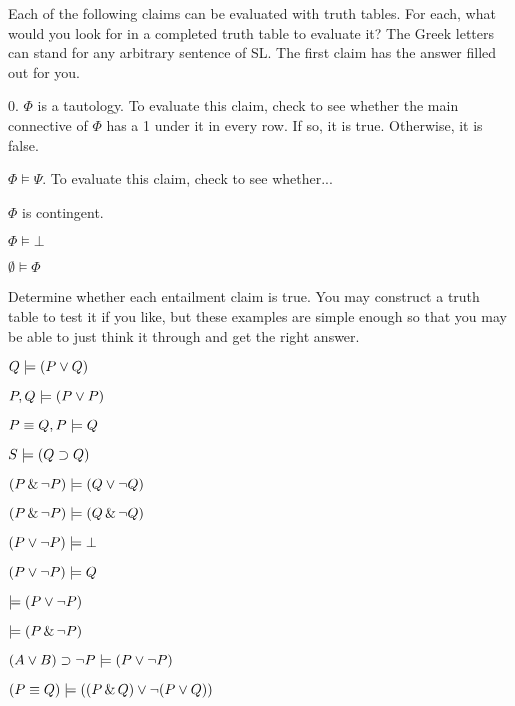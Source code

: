\practiceproblems


\solutions
\problempart
\label{pr.treesetup}
Each of the following claims can be evaluated with truth tables. For each, what would you look for in a completed truth table to evaluate it? The Greek letters can stand for any arbitrary sentence of SL. The first claim has the answer filled out for you.

\begin{earg}
		\item[0.] $\Phi$ is a tautology.
		To evaluate this claim, check to see whether the main connective of $\Phi$ has a 1 under it in every row. If so, it is true. Otherwise, it is false.
		\item $\Phi \models \Psi$. 
		To evaluate this claim, check to see whether... 
		
		\item $\Phi$ is contingent.
\item $\Phi \models \bot$
		\item $\emptyset \models \Phi$
	\end{earg}

\solutions
\problempart
\label{pr.entailTF}
Determine whether each entailment claim is true. You may construct a truth table to test it if you like, but these examples are simple enough so that you may be able to just think it through and get the right answer.
\begin{earg}
\item $Q \models (P \vee Q)$
\item $P, Q \models (P \vee P)$
\item $P \equiv Q, P \models Q$
\item $S \models (Q \supset Q)$   
\item $(P \,\&\, \neg P) \models (Q \vee \neg Q)$
\item $(P \,\&\, \neg P) \models (Q \,\&\, \neg Q)$
\item $(P \vee \neg P) \models \bot$
\item $(P \vee \neg P) \models Q$
\item $\models (P \vee \neg P)$
\item $\models (P \,\&\, \neg P)$
\item $(A \vee B) \supset \neg P \models (P \vee \neg P)$
\item $(P \equiv Q) \models ((P \,\&\, Q) \vee \neg (P \vee Q))$
\end{earg}


